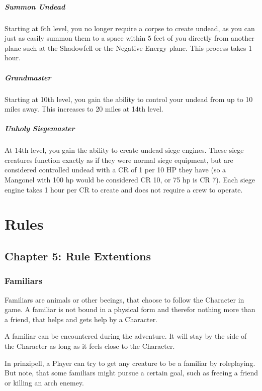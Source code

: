 \documentclass[10pt,twoside,twocolumn,openany]{book}
\begin{document}
\subsubsection{Summon Undead}
Starting at 6th level, you no longer require a corpse to create undead, as you can just as easily summon them to a space within 5 feet of you directly from another plane such at the Shadowfell or the Negative Energy plane. This process takes 1 hour.

\subsubsection{Grandmaster}
Starting at 10th level, you gain the ability to control your undead from up to 10 miles away. This increases to 20 miles at 14th level.

\subsubsection{Unholy Siegemaster}
At 14th level, you gain the ability to create undead siege engines. These siege creatures function exactly as if they were normal siege equipment, but are considered controlled undead with a CR of 1 per 10 HP they have (so a Mangonel with 100 hp would be considered CR 10, or 75 hp is CR 7). Each siege engine takes 1 hour per CR to create and does not require a crew to operate.

\part{Rules}
\chapter{Chapter 5: Rule Extentions}
\section{Familiars}

Familiars are animals or other beeings, that choose to follow the Character in game. A familiar is not bound in a physical form and therefor nothing more than a friend, that helps and gets help by a Character.

A familiar can be encountered during the adventure. It will stay by the side of the Character as long as it feels close to the Character.

In prinzipell, a Player can try to get any creature to be a familiar by roleplaying. But note, that some familiars might pursue a certain goal, such as freeing a friend or killing an arch enemey.
\end{document}
